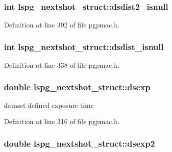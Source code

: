 \hypertarget{structlspg__nextshot__struct_a7fce65f4719a4a8110006f8b72eec3f7}{
\subsubsection[{dsdist2\-\_\-isnull}]{\setlength{\rightskip}{0pt plus 5cm}int lspg\-\_\-nextshot\-\_\-struct\-::dsdist2\-\_\-isnull}}\label{structlspg__nextshot__struct_a7fce65f4719a4a8110006f8b72eec3f7}


Definition at line 392 of file pgpmac.\-h.

\hypertarget{structlspg__nextshot__struct_ac6f2bdc7b023d933509bf74af7b169f9}{
\subsubsection[{dsdist\-\_\-isnull}]{\setlength{\rightskip}{0pt plus 5cm}int lspg\-\_\-nextshot\-\_\-struct\-::dsdist\-\_\-isnull}}\label{structlspg__nextshot__struct_ac6f2bdc7b023d933509bf74af7b169f9}


Definition at line 338 of file pgpmac.\-h.

\hypertarget{structlspg__nextshot__struct_a063e4c99201a763c2eb048acfc855efa}{
\subsubsection[{dsexp}]{\setlength{\rightskip}{0pt plus 5cm}double lspg\-\_\-nextshot\-\_\-struct\-::dsexp}}\label{structlspg__nextshot__struct_a063e4c99201a763c2eb048acfc855efa}


dataset defined exposure time 



Definition at line 316 of file pgpmac.\-h.

\hypertarget{structlspg__nextshot__struct_a4d8c34309572875352ddabe9cc9001ee}{
\subsubsection[{dsexp2}]{\setlength{\rightskip}{0pt plus 5cm}double lspg\-\_\-nextshot\-\_\-struct\-::dsexp2}}\label{structlspg__nextshot__struct_a4d8c34309572875352ddabe9cc9001ee}


